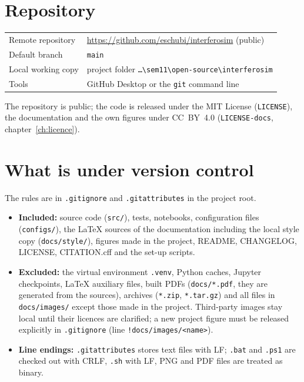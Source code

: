 
\section{Repository}

\begin{center}
\begin{tabular}{@{}ll@{}}
\toprule
Remote repository & \url{https://github.com/eschubi/interferosim} (public) \\
Default branch & \texttt{main} \\
Local working copy & project folder \texttt{\ldots\textbackslash sem11\textbackslash open-source\textbackslash interferosim} \\
Tools & GitHub Desktop or the \texttt{git} command line \\
\bottomrule
\end{tabular}
\end{center}

The repository is public; the code is released under the MIT License
(\texttt{LICENSE}), the documentation and the own figures under
CC~BY~4.0 (\texttt{LICENSE-docs}, chapter~\ref{ch:licence}).  %

\section{What is under version control}

The rules are in \texttt{.gitignore} and \texttt{.gitattributes} in the
project root.
\begin{itemize}
  \item \textbf{Included:} source code (\texttt{src/}), tests,
        notebooks, configuration files (\texttt{configs/}), the \LaTeX{}
        sources of the documentation including the local style copy
        (\texttt{docs/style/}), figures made in the project, README,
        CHANGELOG, LICENSE, CITATION.cff and the set-up scripts.
  \item \textbf{Excluded:} the virtual environment \texttt{.venv},
        Python caches, Jupyter checkpoints, \LaTeX{} auxiliary files,
        built PDFs (\texttt{docs/*.pdf}, they are generated from the
        sources), archives (\texttt{*.zip}, \texttt{*.tar.gz}) and all
        files in \texttt{docs/images/} except those made in the project.
        Third-party images stay local until their licences are clarified;
        a new project figure must be released explicitly in
        \texttt{.gitignore} (line \texttt{!docs/images/<name>}).
  \item \textbf{Line endings:} \texttt{.gitattributes} stores text files
        with LF; \texttt{.bat} and \texttt{.ps1} are checked out with CRLF,
        \texttt{.sh} with LF, PNG and PDF files are treated as binary.
\end{itemize}

